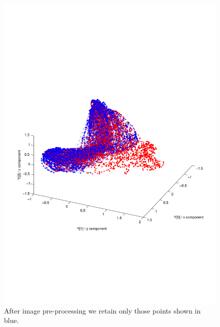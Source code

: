 \documentclass[11pt]{article} %
\begin{document}
\begin{figure}
\centering
\includegraphics*[trim={0 5cm 0 9cm},clip,width=0.75\linewidth,clip]{manifoldAfterImageProcessing.pdf} 
\caption{After image pre-processing we retain only those points shown in blue. }
\label{fig:manifoldAfterImageProcessing}
\end{figure}
\end{document}
